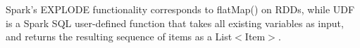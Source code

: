 Spark’s EXPLODE functionality corresponds to flatMap() on RDDs, while UDF is a Spark SQL user-defined function that takes all existing variables as input, and returns the resulting sequence of items as a List$<$Item$>$.

